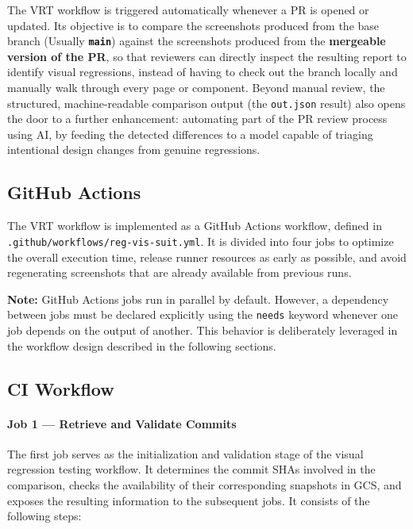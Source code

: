 The \ac{VRT} workflow is triggered automatically whenever a \ac{PR} is opened or updated. Its objective is to compare the screenshots produced from the base branch (Usually \textbf{\texttt{main}}) against the screenshots produced from the \textbf{mergeable version of the \ac{PR}}, so that reviewers can directly inspect the resulting report to identify visual regressions, instead of having to check out the branch locally and manually walk through every page or component. Beyond manual review, the structured, machine-readable comparison output (the \texttt{out.json} result) also opens the door to a further enhancement: automating part of the \ac{PR} review process using \ac{AI}, by feeding the detected differences to a model capable of triaging intentional design changes from genuine regressions.

\subsection{GitHub Actions}

The \ac{VRT} workflow is implemented as a GitHub Actions workflow, defined in \texttt{\allowbreak .github/workflows/reg-vis-suit.yml}. It is divided into four jobs to optimize the overall execution time, release runner resources as early as possible, and avoid regenerating screenshots that are already available from previous runs.

\textbf{Note:} GitHub Actions jobs run in parallel by default. However, a dependency between jobs must be declared explicitly using the \texttt{needs} keyword whenever one job depends on the output of another. This behavior is deliberately leveraged in the workflow design described in the following sections.

\subsection{CI Workflow}

\paragraph{Job 1 --- Retrieve and Validate Commits}

The first job serves as the initialization and validation stage of the visual regression testing workflow. It determines the commit SHAs involved in the comparison, checks the availability of their corresponding snapshots in \ac{GCS}, and exposes the resulting information to the subsequent jobs. It consists of the following steps:


